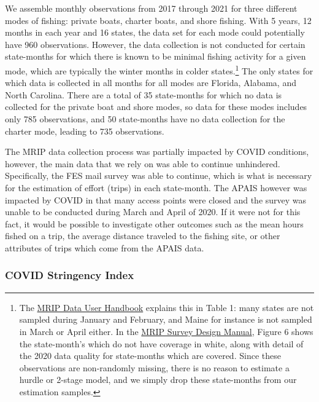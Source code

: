 \documentclass[12pt]{article}
\begin{document}
We assemble monthly observations from 2017 through 2021 for three
different modes of fishing: private boats, charter boats, and shore
fishing. With 5 years, 12 months in each year and 16 states, the data
set for each mode could potentially have 960 observations. However, the
data collection is not conducted for certain state-months for which
there is known to be minimal fishing activity for a given mode, which
are typically the winter months in colder states.\footnote{The
  \href{https://media.fisheries.noaa.gov/2021-09/MRIP\%20Data\%20User\%20Handbook\%20Updated\%202021-09-30.pdf}{MRIP
  Data User Handbook} explains this in Table 1: many states are not
  sampled during January and February, and Maine for instance is not
  sampled in March or April either. In the
  \href{https://media.fisheries.noaa.gov/2021-09/MRIP-Survey-Design-and-Statistical-Methods-2021-09-15.pdf}{MRIP
  Survey Design Manual}, Figure 6 shows the state-month's which do not
  have coverage in white, along with detail of the 2020 data quality for
  state-months which are covered. Since these observations are
  non-randomly missing, there is no reason to estimate a hurdle or
  2-stage model, and we simply drop these state-months from our
  estimation samples.} The only states for which data is collected in
all months for all modes are Florida, Alabama, and North Carolina. There
are a total of 35 state-months for which no data is collected for the
private boat and shore modes, so data for these modes includes only 785
observations, and 50 state-months have no data collection for the
charter mode, leading to 735 observations.

The MRIP data collection process was partially impacted by COVID
conditions, however, the main data that we rely on was able to continue
unhindered. Specifically, the FES mail survey was able to continue,
which is what is necessary for the estimation of effort (trips) in each
state-month. The APAIS however was impacted by COVID in that many access
points were closed and the survey was unable to be conducted during
March and April of 2020. If it were not for this fact, it would be
possible to investigate other outcomes such as the mean hours fished on
a trip, the average distance traveled to the fishing site, or other
attributes of trips which come from the APAIS data.

\subsubsection{COVID Stringency Index}
\end{document}

